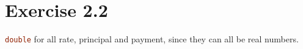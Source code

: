 \documentclass{article}
\begin{document}
\section*{Exercise 2.2}

\lstinline[language=C++]|double| for all rate, principal and payment, since they can all
be real numbers.
\end{document}
